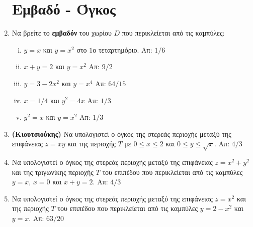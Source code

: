 \begin{enumerate}
    \section*{Εμβαδό - Όγκος}

  \item Να βρείτε το \textbf{εμβαδόν} του χωρίου $D$ που περικλείεται από τις καμπύλες: 
    \begin{enumerate}[i)]
      \item $y=x$ και $y=x^2$ στο $1$ο τεταρτημόριο. \hfill Απ: ${1}/{6}$
      \item $x+y=2$ και $y=x^2$ \hfill Απ: ${9}/{2}$
      \item $y=3-2x^2$ και $y=x^4$ \hfill Απ: ${64}/{15}$
      \item $x={1}/{4}$ και $y^2=4x$ \hfill Απ: ${1}/{3}$ %
      \item $y^2=x$ και $y=x^2$ \hfill Απ: ${1}/{3}$ %
    \end{enumerate}

  \item \textbf{(Κιουτσιούκης)} Να υπολογιστεί ο όγκος της στερεάς περιοχής μεταξύ της 
    επιφάνειας $ z=xy $ και της περιοχής $T$ με $ 0 \leq x \leq 2 $ και 
    $ 0 \leq y \leq \sqrt{x} $. 
    \hfill Απ: $ 4/3 $ 





  \item Να υπολογιστεί ο όγκος της στερεάς περιοχής μεταξύ της επιφάνειας 
    $ z=x^{2}+y^{2} $ και της τριγωνίκης περιοχής $T$ του επιπέδου που περικλείεται από 
    τις καμπύλες $ y= x $, $x=0$ και $ x+y=2 $.
    \hfill Απ: $ 4/3 $  

  \item Να υπολογιστεί ο όγκος της στερεάς περιοχής μεταξύ της επιφάνειας 
    $ z=x^{2} $ και της περιοχής $T$ του επιπέδου που περικλείεται από 
    τις καμπύλες $ y= 2-x^{2} $  και $y=x$.
    \hfill Απ: $ 63/20 $ 


\end{enumerate}
